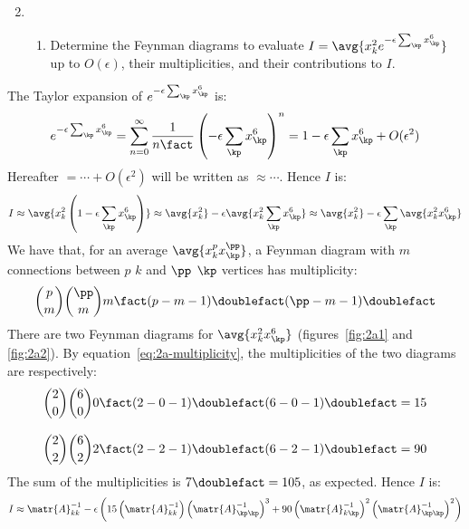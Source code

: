 \begin{enumerate}[leftmargin=0cm]
  \setcounter{enumi}{1}
  \item
        \begin{enumerate}
          \item \label{2a}
                Determine the Feynman diagrams to evaluate $I = \avg{x_k^2 e^{- \epsilon
                        \sum_\kp x_\kp^6 }}$ up to $O(\epsilon)$, their multiplicities, and their
                contributions to $I$.
        \end{enumerate}
\end{enumerate}

The Taylor expansion of $e^{-\epsilon \sum_\kp x_\kp^6}$ is:
\begin{equation*}
  e^{-\epsilon \sum_\kp x_\kp^6}
  = \sum_{n=0}^{\infty} \frac{1}{n\fact} \left( -\epsilon \sum_\kp x_\kp^6 \right)^n
  = 1 - \epsilon \sum_\kp x_\kp^6 + O(\epsilon^2)
\end{equation*}
Hereafter $=\cdots + O(\epsilon^2)$ will be written as $\approx\cdots$.
Hence $I$ is:
\begin{equation*}
  I \approx \avg{x_k^2 \left(1 - \epsilon \sum_\kp x_\kp^6 \right)} \approx
  \avg{x_k^2} - \epsilon \avg{x_k^2 \sum_\kp x_\kp^6} \approx \avg{x_k^2} -
  \epsilon \sum_\kp \avg{x_k^2 x_\kp^6}
\end{equation*}
We have that, for an average $\avg{x_k^p x_\kp^\pp}$, a Feynman diagram with $m$
connections between $p$ $k$ and $\pp$ $\kp$ vertices has multiplicity:
\begin{equation}{}
  \label{eq:2a-multiplicity}
  {p \choose m} {\pp \choose m} m\fact (p - m - 1)\doublefact (\pp - m - 1)\doublefact
\end{equation}
There are two Feynman diagrams for $\avg{x_k^2 x_\kp^6}$ (figures~\ref{fig:2a1}
and \ref{fig:2a2}).
By equation~\ref{eq:2a-multiplicity}, the multiplicities of the two diagrams are
respectively:
\begin{align*}{}
  {2 \choose 0} {6 \choose 0} 0\fact (2 - 0 - 1)\doublefact (6 - 0 - 1)\doublefact & = 15
  \\[2ex]
  {2 \choose 2} {6 \choose 2} 2\fact (2 - 2 - 1)\doublefact (6 - 2 - 1)\doublefact & = 90
\end{align*}
The sum of the multiplicities is $7\doublefact = 105$, as expected.
Hence $I$ is:
\begin{equation*}
  I \approx
  \matr{A}^{-1}_{kk} - \epsilon \left(
  15 \left(\matr{A}^{-1}_{kk}\right) \left(\matr{A}^{-1}_{\kp\kp}\right)^3 +
  90 \left(\matr{A}^{-1}_{k\kp}\right)^2 \left(\matr{A}^{-1}_{\kp\kp}\right)^2
  \right)
\end{equation*}

